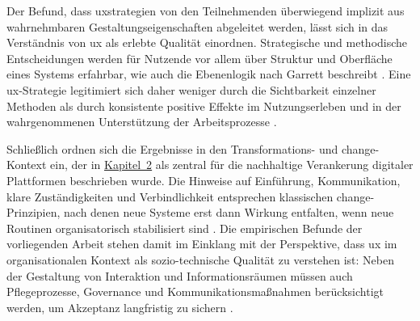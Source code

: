 Der Befund, dass \Gls{uxstrategien} von den Teilnehmenden überwiegend implizit aus wahrnehmbaren Gestaltungseigenschaften abgeleitet werden, lässt sich in das Verständnis von \acrlong{ux} als erlebte Qualität einordnen. Strategische und methodische Entscheidungen werden für Nutzende vor allem über Struktur und Oberfläche eines Systems erfahrbar, wie auch die Ebenenlogik nach Garrett beschreibt \cite{401:Garrett2011}. Eine \Gls{ux}-Strategie legitimiert sich daher weniger durch die Sichtbarkeit einzelner Methoden als durch konsistente positive Effekte im Nutzungserleben und in der wahrgenommenen Unterstützung der Arbeitsprozesse \cite{300:FraunhoferIESE2018,101:Khan2021,100:WhartonUX2015}.

Schließlich ordnen sich die Ergebnisse in den Transformations- und \Gls{change}-Kontext ein, der in \hyperref[ch:02_theoretical-foundations]{Kapitel~2} als zentral für die nachhaltige Verankerung digitaler Plattformen beschrieben wurde. Die Hinweise auf Einführung, Kommunikation, klare Zuständigkeiten und Verbindlichkeit entsprechen klassischen \Gls{change}-Prinzipien, nach denen neue Systeme erst dann Wirkung entfalten, wenn neue Routinen organisatorisch stabilisiert sind \cite{110:Lewin1947,418:Kotter2012}.
Die empirischen Befunde der vorliegenden Arbeit stehen damit im Einklang mit der Perspektive, dass \Gls{ux} im organisationalen Kontext als sozio-technische Qualität zu verstehen ist: Neben der Gestaltung von Interaktion und Informationsräumen müssen auch Pflegeprozesse, Governance und Kommunikationsmaßnahmen berücksichtigt werden, um Akzeptanz langfristig zu sichern \cite{417:Benyon2019,114:IntranetAdoption,116:StepTwoGuidance}.
